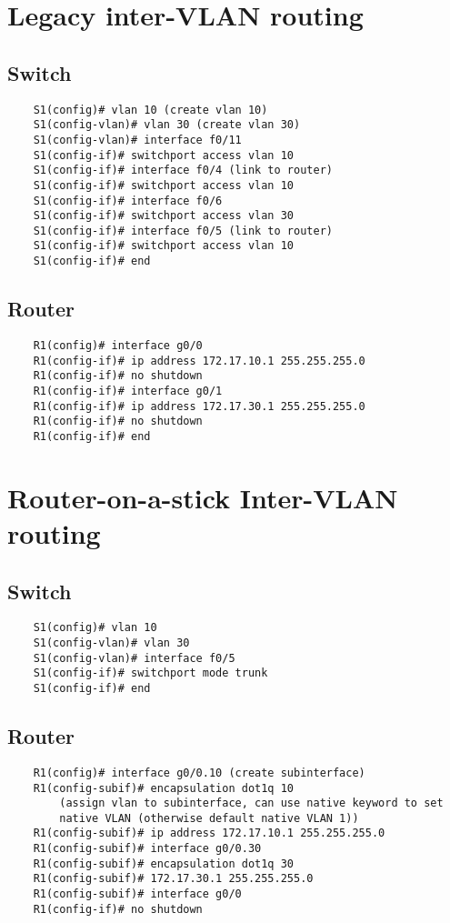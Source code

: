 \documentclass[10pt, a4paper]{article}
\begin{document}
	\section{Legacy inter-VLAN routing}
	\subsection{Switch}
	\begin{lstlisting}
	S1(config)# vlan 10 (create vlan 10)
	S1(config-vlan)# vlan 30 (create vlan 30)
	S1(config-vlan)# interface f0/11
	S1(config-if)# switchport access vlan 10
	S1(config-if)# interface f0/4 (link to router)
	S1(config-if)# switchport access vlan 10
	S1(config-if)# interface f0/6
	S1(config-if)# switchport access vlan 30
	S1(config-if)# interface f0/5 (link to router)
	S1(config-if)# switchport access vlan 10
	S1(config-if)# end
	\end{lstlisting}

	\subsection{Router}
	\begin{lstlisting}
	R1(config)# interface g0/0
	R1(config-if)# ip address 172.17.10.1 255.255.255.0
	R1(config-if)# no shutdown
	R1(config-if)# interface g0/1
	R1(config-if)# ip address 172.17.30.1 255.255.255.0
	R1(config-if)# no shutdown
	R1(config-if)# end
	\end{lstlisting}

	\section{Router-on-a-stick Inter-VLAN routing}
	\subsection{Switch}
	\begin{lstlisting}
	S1(config)# vlan 10
	S1(config-vlan)# vlan 30
	S1(config-vlan)# interface f0/5
	S1(config-if)# switchport mode trunk
	S1(config-if)# end
	\end{lstlisting}

	\subsection{Router}
	\begin{lstlisting}
	R1(config)# interface g0/0.10 (create subinterface)
	R1(config-subif)# encapsulation dot1q 10
		(assign vlan to subinterface, can use native keyword to set
		native VLAN (otherwise default native VLAN 1))
	R1(config-subif)# ip address 172.17.10.1 255.255.255.0
	R1(config-subif)# interface g0/0.30
	R1(config-subif)# encapsulation dot1q 30
	R1(config-subif)# 172.17.30.1 255.255.255.0
	R1(config-subif)# interface g0/0
	R1(config-if)# no shutdown
	\end{lstlisting}
\end{document}

